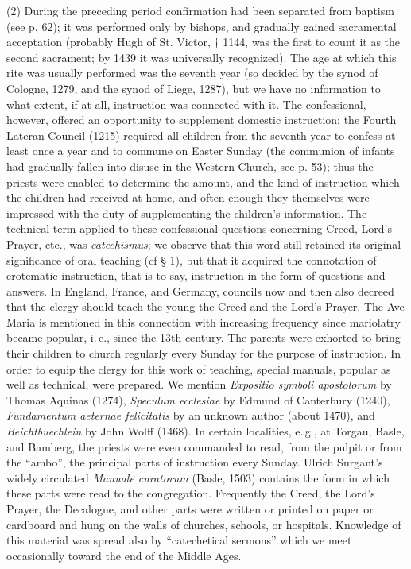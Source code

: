 (2) During the preceding period confirmation had been separated from baptism (see p. 62); it was performed only by bishops, and gradually gained sacramental acceptation (probably Hugh of St. Victor, † 1144, was the first to count it as the second sacrament; by 1439 it was universally recognized). The age at which this rite was usually performed was the seventh year (so decided by the synod of Cologne, 1279, and the synod of Liege, 1287), but we have no information to what extent, if at all, instruction was connected with it. The confessional, however, offered an opportunity to supplement domestic instruction: the Fourth Lateran Council
(1215) required all children from the seventh year to confess at least once a year and to commune on Easter Sunday (the communion of infants had gradually fallen into disuse in the Western Church, see p. 53); thus the priests were enabled to determine the amount, and the kind of instruction which the children had received at home, and often enough they themselves were impressed with the duty of supplementing the children’s information. The technical term applied to these confessional questions concerning Creed, Lord’s Prayer, etc., was \emph{catechismus}; we observe that this word still retained its original significance of oral teaching (cf § 1), but that it acquired the connotation of erotematic instruction, that is to say, instruction in the form of questions and answers. In England, France, and Germany, councils now and then also decreed that the clergy should teach the young the Creed and the Lord’s Prayer. The Ave Maria is mentioned in this connection with increasing frequency since mariolatry became popular, i.\,e., since the 13th century. The parents were exhorted to bring their children to church regularly every Sunday for the purpose of instruction. In order to equip the clergy for this work of teaching, special manuals, popular as well as technical, were prepared. We mention \emph{Expositio symboli apostolorum} by Thomas Aquinas (1274), \emph{Speculum ecclesiae} by Edmund of Canterbury (1240), \emph{Fundamentum aeternae felicitatis} by an unknown author (about 1470), and \emph{Beichtbuechlein} by John Wolff (1468). In certain localities, e.\,g., at Torgau, Basle, and Bamberg, the priests were even commanded to read, from the pulpit or from the “ambo”, the principal parts of instruction every Sunday. Ulrich Surgant’s widely circulated \emph{Manuale curatorum} (Basle, 1503) contains the form in which these parts were read to the congregation. Frequently the Creed, the Lord’s Prayer, the Decalogue, and other parts were written or printed on paper or cardboard and hung on the walls of churches, schools, or
hospitals. Knowledge of this material was spread also by “catechetical sermons” which we meet occasionally toward the end of the Middle Ages.

